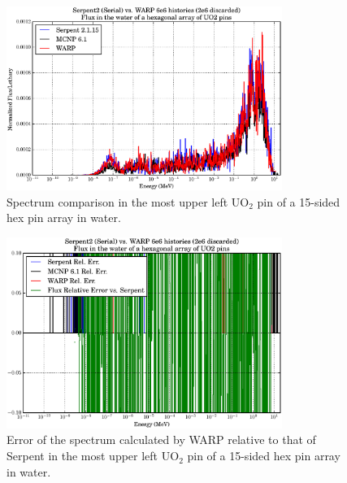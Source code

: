 \begin{figure}[h!] 
\centering
\includegraphics[width=0.8\textwidth]{graphics/finalresults/assembly_spec.eps}
\caption{Spectrum comparison in the most upper left UO$_2$ pin of a 15-sided hex pin array in water. \label{assembly_spec} }
\end{figure}

\begin{figure}[h!] 
\centering
\includegraphics[width=0.8\textwidth]{graphics/finalresults/assembly_spec_err.eps}
\caption{Error of the spectrum calculated by WARP relative to that of Serpent in the most upper left UO$_2$ pin of a 15-sided hex pin array in water. \label{assembly_spec_err} }
\end{figure}


